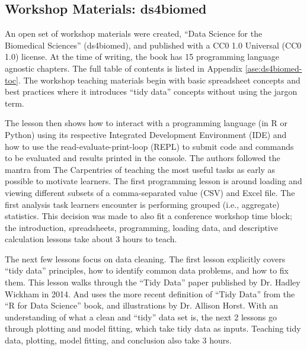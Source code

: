 \documentclass[030-workshop.tex]{subfiles}
\begin{document}
    \subsection{Workshop Materials: ds4biomed}

        An open set of workshop materials were created, ``Data Science for the Biomedical Sciences'' (ds4biomed),
        and published with a CC0 1.0 Universal (CC0 1.0) license. %
        At the time of writing, the book has 15 programming language agnostic chapters.
        The full table of contents is listed in Appendix \ref{ase:ds4biomed-toc}.
        The workshop teaching materials begin with basic spreadsheet concepts and
        best practices where it introduces ``tidy data'' concepts
        without using the jargon term.

        The lesson then shows how to interact with a programming language (in R or Python) using
        its respective Integrated Development Environment (IDE) and
        how to use the read-evaluate-print-loop (REPL)
        to submit code and commands to be evaluated and results printed in the console.
        The authors followed the mantra from The Carpentries of teaching the most useful tasks as early as possible
        to motivate learners.
        The first programming lesson is around loading and viewing different subsets of a
        comma-separated value (CSV) and Excel file.
        The first analysis task learners encounter is performing grouped (i.e., aggregate) statistics.
        This decision was made to also fit a conference workshop time block;
        the introduction, spreadsheets, programming, loading data, and descriptive calculation lessons
        take about 3 hours to teach.

        The next few lessons focus on data cleaning.
        The first lesson explicitly covers ``tidy data'' principles,
        how to identify common data problems,
        and how to fix them.
        This lesson walks through the ``Tidy Data'' paper published by Dr. Hadley Wickham in 2014. %
        And uses the more recent definition of ``Tidy Data'' from the ``R for Data Science'' book, %
        and illustrations by Dr. Allison Horst. %
        With an understanding of what a clean and ``tidy'' data set is,
        the next 2 lessons go through plotting and model fitting,
        which take tidy data as inputs.
        Teaching tidy data, plotting, model fitting, and conclusion also take 3 hours.
\end{document}
